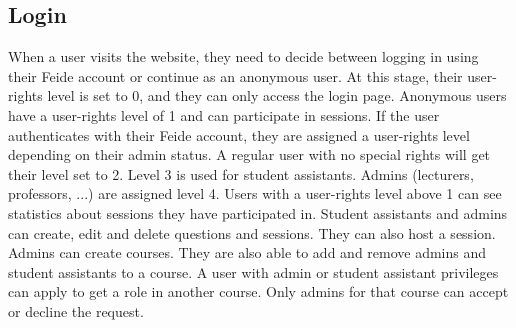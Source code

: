 \subsection{Login}
When a user visits the website, they need to decide between logging in using their Feide account or continue as an anonymous user. At this stage, their user-rights level is set to 0, and they can only access the login page. Anonymous users have a user-rights level of 1 and can participate in sessions. If the user authenticates with their Feide account, they are assigned a user-rights level depending on their admin status. A regular user with no special rights will get their level set to 2. Level 3 is used for student assistants. Admins (lecturers, professors, ...) are assigned level 4. Users with a user-rights level above 1 can see statistics about sessions they have participated in. Student assistants and admins can create, edit and delete questions and sessions. They can also host a session. Admins can create courses. They are also able to add and remove admins and student assistants to a course. A user with admin or student assistant privileges can apply to get a role in another course. Only admins for that course can accept or decline the request.
